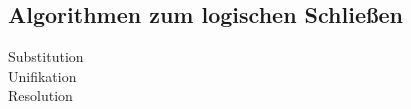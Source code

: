 \subsection{Algorithmen zum logischen Schließen}
    \begin{description}
        \item[Substitution]
        \item[Unifikation]
        \item[Resolution]
    \end{description}
